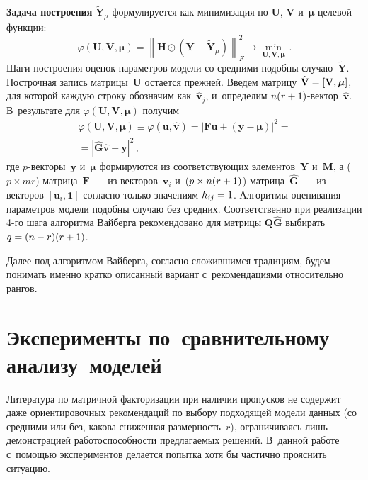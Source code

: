 \begin{multicols}{2}
     \textbf{Задача построения} $\tilde{\mathbf{Y}}_\mu$ формулируется 
как минимизация по $\mathbf{U}$, $\mathbf{V}$ и~$\bm{\mu}$ целевой 
функции:
     $$
     \varphi(\mathbf{U}, \mathbf{V}, \bm{\mu}) =\left\| \mathbf{H}\odot 
\left(\mathbf{Y}-\tilde{\mathbf{Y}}_\mu \right)\right\|^2_F \to 
\min\limits_{\mathbf{U}, \mathbf{V}, \bm{\mu}}\,.
     $$
Шаги построения оценок параметров модели со средними подобны 
случаю~$\tilde{\mathbf{Y}}$. Построчная запись матрицы~$\mathbf{U}$ 
остается прежней. Введем матрицу $\hat{\mathbf{V}}\hm= 
[\mathbf{V},\bm{\mu}]$, для которой каждую строку обозначим 
как~$\hat{\bm{v}}_j$, и~определим $n(r\hm+1)$-век\-тор~$\hat{\bm{v}}$. 
В~результате для $\varphi(\mathbf{U}, \mathbf{V}, \bm{\mu})$ получим 
\begin{multline*}
\varphi (\mathbf{U}, \mathbf{V}, \bm{\mu})\equiv \varphi(\bm{u},\hat{\bm{v}}) =
\left\vert 
\mathbf{F}\bm{u}+(\bm{y}- \bm{\mu})\right\vert^2 ={}\\
{}=\left\vert \hat{\mathbf{G}} 
\hat{\bm{v}} -\bm{y}\right\vert^2\,,
\end{multline*}
где $p$-векторы~$\bm{y}$ и~$\bm{\mu}$ формируются из соответствующих 
элементов~$\mathbf{Y}$ и~$\mathbf{M}$, а  
($p\times mr$)-мат\-ри\-ца~$\mathbf{F}$~--- из векторов~$\bm{v}_i$ и~($p\times 
n(r\hm+1)$)-мат\-ри\-ца~$\hat{\mathbf{G}}$~--- из векторов $[\bm{u}_i, 
\mathbf{1}]$ согласно только значениям $h_{ij}\hm=1$. Алгоритмы оценивания 
параметров модели подобны случаю без средних. Соответственно при 
реализации 4-го шага алгоритма Вайберга рекомендовано для матрицы 
$\mathbf{Q}\hat{\mathbf{G}}$ выбирать $q\hm= (n\hm- r) (r\hm+ 1)$.

     
     Далее под алгоритмом Вайберга, согласно сложившимся традициям, 
будем понимать именно кратко описанный вариант с~рекомендациями 
относительно рангов.


     
\section{Эксперименты по~сравнительному анализу~моделей}

     Литература по матричной факторизации при наличии пропусков не 
содержит даже ориентировочных рекомендаций по выбору под\-хо\-дя\-щей модели 
данных (со средними или без, какова сниженная раз\-мер\-ность~$r$), 
ограничиваясь лишь демонстрацией ра\-бо\-то\-спо\-соб\-ности пред\-ла\-га\-емых 
решений. В~данной работе с~по\-мощью экспериментов делается попытка хотя 
бы час\-тич\-но прояснить си\-ту\-ацию. 
{

}
\end{multicols}
